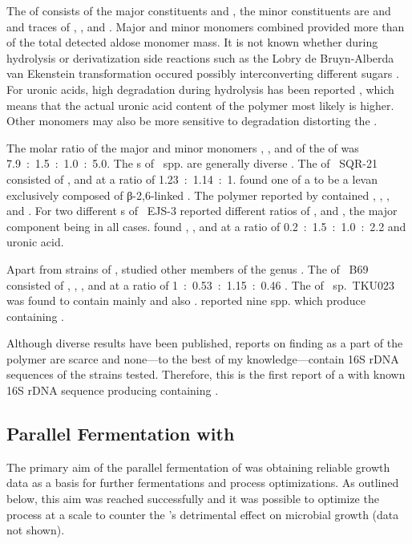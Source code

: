 The \eps{} of  consists of the major constituents \glc{} and \man{}, the minor constituents are \glcn{} and \glcua{} and traces of \rha{}, \gal{}, \galn{} and \glcnac{}. Major and minor monomers combined provided more than  of the total detected aldose monomer mass. It is not known whether during hydrolysis or derivatization side reactions such as the Lobry de Bruyn-Alberda van Ekenstein transformation occured possibly interconverting different sugars \cite{Angyal2001}. For uronic acids, high degradation during hydrolysis has been reported \cite{Ruehmann2015a}, which means that the actual uronic acid content of the polymer most likely is higher. Other monomers may also be more sensitive to degradation distorting the \eps{} \amc{}.

The molar ratio of the major and minor monomers \glc{}, \glcn{}, \glcua{} and \man{} of the \eps{} of \strain{} was 7.9~:~1.5~:~1.0~:~5.0. The \eps{}s of ~spp. are generally diverse \cite{Liang2015}. The \eps{} of ~SQR-21 consisted of \man{}, \gal{} and \glc{} at a ratio of 1.23~:~1.14~:~1. \textcite{Han1990} found one \eps{} of a  to be a levan exclusively composed of β-2,6-linked \frc{}. The polymer reported by \textcite{Lee1997} contained \glc{}, \gal{}, \glcua{}, \man{} and \fuc{}. For two different \eps{}s of ~EJS-3 \textcite{Liu2009} reported different ratios of \glc{}, \frc{} and \man{}, the major component being \frc{} in all cases. \textcite{Madden1986} found \fuc{}, \man{}, \gal{} and \glc{} at a ratio of 0.2~:~1.5~:~1.0~:~2.2 and uronic acid.

Apart from strains of , \textcite{Wang2011, Li2013} studied other members of the genus . The \eps{} of ~B69 consisted of \glc{}, \glcua{}, \xyl{}, and \man{} at a ratio of 1~:~0.53~:~1.15~:~0.46 \cite{Li2013}. The \eps{} of ~sp.~TKU023 was found to contain mainly \glc{} and also \man{} \cite{Wang2011}. \textcite{Ruehmann2015b} reported nine  spp. which produce \eps{} containing \glcn{}.

Although diverse results have been published, reports on finding \glcn{} as a part of the polymer are scarce and none---to the best of my knowledge---contain 16S rDNA sequences of the strains tested. Therefore, this is the first report of a  with known 16S rDNA sequence producing \eps{} containing \glcn{}.

\subsection{Parallel Fermentation with \LCH{}\label{subsec-lch-eps-disc-lch-pf}}
The primary aim of the parallel fermentation of \strain{} was obtaining reliable growth data as a basis for further fermentations and process optimizations. As outlined below, this aim was reached successfully and it was possible to optimize the process at a  scale to counter the \lch{}'s detrimental effect on microbial growth (data not shown).

